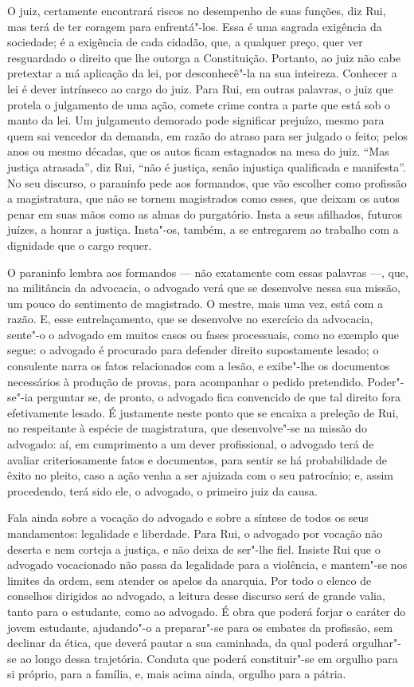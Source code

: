O juiz, certamente encontrará riscos no desempenho de suas funções, diz
Rui, mas terá de ter coragem para enfrentá"-los. Essa é uma sagrada
exigência da sociedade; é a exigência de cada cidadão, que, a qualquer
preço, quer ver resguardado o direito que lhe outorga a Constituição.
Portanto, ao juiz não cabe pretextar a má aplicação da lei, por
desconhecê"-la na sua inteireza. Conhecer a lei é dever intrínseco ao
cargo do juiz. Para Rui, em outras palavras, o juiz que protela o
julgamento de uma ação, comete crime contra a parte que está sob o
manto da lei. Um julgamento demorado pode significar prejuízo, mesmo
para quem sai vencedor da demanda, em razão do atraso para ser julgado
o feito; pelos anos ou mesmo décadas, que os autos ficam estagnados na
mesa do juiz. ``Mas justiça atrasada'', diz Rui, ``não é justiça, senão
injustiça qualificada e manifesta''. No seu discurso, o paraninfo pede
aos formandos, que vão escolher como profissão a magistratura, que não
se tornem magistrados como esses, que deixam os autos penar em suas
mãos como as almas do purgatório. Insta a seus afilhados, futuros
juízes, a honrar a justiça. Insta"-os, também, a se entregarem ao
trabalho com a dignidade que o cargo requer. 

O paraninfo lembra aos formandos --- não exatamente com essas palavras ---,
que, na militância da advocacia, o advogado verá que se desenvolve
nessa sua missão, um pouco do sentimento de magistrado. O mestre, mais
uma vez, está com a razão. E, esse entrelaçamento, que se desenvolve no
exercício da advocacia, sente"-o o advogado em muitos casos ou fases
processuais, como no exemplo que segue: o advogado é procurado para
defender direito supostamente lesado; o consulente narra os fatos
relacionados com a lesão, e exibe"-lhe os documentos necessários à
produção de provas, para acompanhar o pedido pretendido. Poder"-se"-ia
perguntar se, de pronto, o advogado fica convencido de que tal direito
fora efetivamente lesado. É justamente neste ponto que se encaixa a
preleção de Rui, no respeitante à espécie de magistratura, que 
desenvolve"-se na missão do advogado: aí, em cumprimento a um dever
profissional, o advogado terá de avaliar criteriosamente fatos e
documentos, para sentir se há probabilidade de êxito no pleito, caso a
ação venha a ser ajuizada com o seu patrocínio; e, assim procedendo,
terá sido ele, o advogado, o primeiro juiz da causa. 

Fala ainda sobre a vocação do advogado
e sobre a síntese de todos os seus mandamentos: legalidade e liberdade.
Para Rui, o advogado por vocação não deserta e nem corteja a justiça, e
não deixa de ser"-lhe fiel. Insiste Rui que o advogado vocacionado não
passa da legalidade para a violência, e mantem"-se nos limites da ordem,
sem atender os apelos da anarquia. Por todo o elenco de conselhos
dirigidos ao advogado, a leitura desse discurso será de
grande valia, tanto para o estudante, como ao advogado. 
É obra que poderá forjar o caráter do jovem
estudante, ajudando"-o a preparar"-se para os embates da profissão, sem
declinar da ética, que deverá pautar a sua caminhada, da qual poderá
orgulhar"-se ao longo dessa trajetória. Conduta que poderá constituir"-se
em orgulho para si próprio, para a família, e, mais acima ainda,
orgulho para a pátria.

